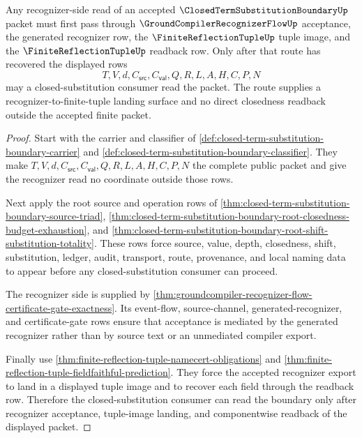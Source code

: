 \begin{theorem}
\label{thm:closed-term-substitution-boundary-recognizer-landing-surface}
Any recognizer-side read of an accepted $\ClosedTermSubstitutionBoundaryUp$ packet must first pass through $\GroundCompilerRecognizerFlowUp$ acceptance, the generated recognizer row, the $\FiniteReflectionTupleUp$ tuple image, and the $\FiniteReflectionTupleUp$ readback row. Only after that route has recovered the displayed rows
$$
T,V,d,C_{\mathsf{src}},C_{\mathsf{val}},Q,R,L,A,H,C,P,N
$$
may a closed-substitution consumer read the packet. The route supplies a recognizer-to-finite-tuple landing surface and no direct closedness readback outside the accepted finite packet.
\end{theorem}
\begin{proof}
Start with the carrier and classifier of \autoref{def:closed-term-substitution-boundary-carrier} and \autoref{def:closed-term-substitution-boundary-classifier}. They make $T,V,d,C_{\mathsf{src}},C_{\mathsf{val}},Q,R,L,A,H,C,P,N$ the complete public packet and give the recognizer read no coordinate outside those rows.

Next apply the root source and operation rows of \autoref{thm:closed-term-substitution-boundary-source-triad}, \autoref{thm:closed-term-substitution-boundary-root-closedness-budget-exhaustion}, and \autoref{thm:closed-term-substitution-boundary-root-shift-substitution-totality}. These rows force source, value, depth, closedness, shift, substitution, ledger, audit, transport, route, provenance, and local naming data to appear before any closed-substitution consumer can proceed.

The recognizer side is supplied by \autoref{thm:groundcompiler-recognizer-flow-certificate-gate-exactness}. Its event-flow, source-channel, generated-recognizer, and certificate-gate rows ensure that acceptance is mediated by the generated recognizer rather than by source text or an unmediated compiler export.

Finally use \autoref{thm:finite-reflection-tuple-namecert-obligations} and \autoref{thm:finite-reflection-tuple-fieldfaithful-prediction}. They force the accepted recognizer export to land in a displayed tuple image and to recover each field through the readback row. Therefore the closed-substitution consumer can read the boundary only after recognizer acceptance, tuple-image landing, and componentwise readback of the displayed packet.
\end{proof}

